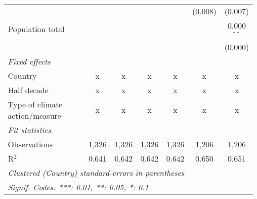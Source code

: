 \begin{tabular}{lcccccc}
                                           &         &         &         &             & (0.008)      & (0.007)\\   
   Population total                        &         &         &         &             &              & 0.000$^{**}$\\   
                                           &         &         &         &             &              & (0.000)\\   
   \emph{Fixed effects}\\
   Country                                 & x       & x       & x       & x           & x            & x\\  
   Half decade                             & x       & x       & x       & x           & x            & x\\  
   Type of climate action/measure          & x       & x       & x       & x           & x            & x\\  
   \midrule \emph{Fit statistics}\\
   Observations                            & 1,326   & 1,326   & 1,326   & 1,326       & 1,206        & 1,206\\  
   R$^2$                                   & 0.641   & 0.642   & 0.642   & 0.642       & 0.650        & 0.651\\  
   \midrule
   \multicolumn{7}{l}{\emph{Clustered (Country) standard-errors in parentheses}}\\
   \multicolumn{7}{l}{\emph{Signif. Codes: ***: 0.01, **: 0.05, *: 0.1}}\\
\end{tabular}
\par\endgroup


